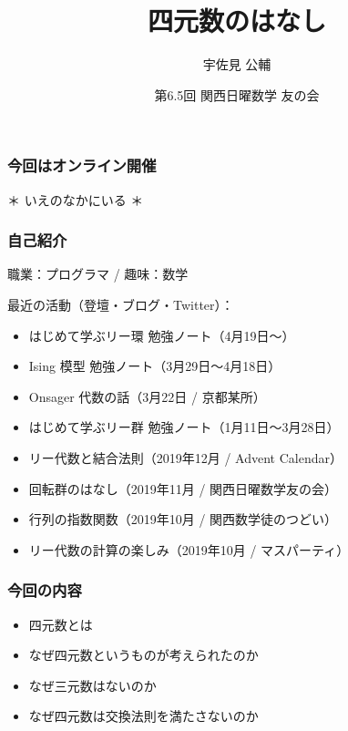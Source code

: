 \documentclass{beamer}
\title{四元数のはなし}
\author{宇佐見 公輔}
\date{第6.5回 関西日曜数学 友の会}
\begin{document}
\maketitle

{
    \begin{frame}
        \frametitle{今回はオンライン開催}

        \begin{center}
            \begin{tcolorbox}[hbox,colback=black,colframe=white,coltext=white]
                ＊ いえのなかにいる ＊
            \end{tcolorbox}
        \end{center}
    \end{frame}
}

\begin{frame}
    \frametitle{自己紹介}

    職業：プログラマ / 趣味：数学

    \bigskip

    最近の活動（登壇・ブログ・Twitter）：
    \begin{itemize}
        \item はじめて学ぶリー環 勉強ノート（4月19日〜）
        \item Ising 模型 勉強ノート（3月29日〜4月18日）
        \item Onsager 代数の話（3月22日 / 京都某所）
        \item はじめて学ぶリー群 勉強ノート（1月11日〜3月28日）
        \item リー代数と結合法則（2019年12月 / Advent Calendar）
        \item 回転群のはなし（2019年11月 / 関西日曜数学友の会）
        \item 行列の指数関数（2019年10月 / 関西数学徒のつどい）
        \item リー代数の計算の楽しみ（2019年10月 / マスパーティ）
    \end{itemize}
\end{frame}

\begin{frame}
    \frametitle{今回の内容}

    \begin{itemize}
        \item 四元数とは
        \item なぜ四元数というものが考えられたのか
        \item なぜ三元数はないのか
        \item なぜ四元数は交換法則を満たさないのか
    \end{itemize}
\end{frame}
\end{document}
